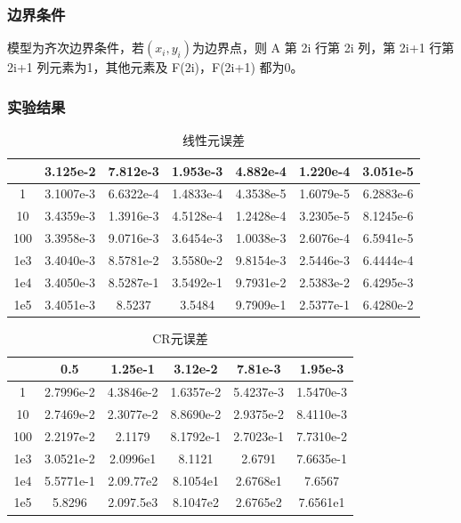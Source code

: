 \documentclass[a4paper,UTF8,titlepage]{ctexart}
\begin{document}
\subsubsection{边界条件}

模型为齐次边界条件，若$(x_i,y_i)$为边界点，则 A 第 2i 行第 2i 列，第 2i+1 行第 2i+1 列元素为1，其他元素及  F(2i)，F(2i+1) 都为0。


%
%

\subsubsection{实验结果}

\begin{table}[h]
	\caption{线性元误差}
	\begin{tabular}{|c|c|c|c|c|c|c|} \hline
		\diagbox{$\lambda$}{h} &3.125e-2 &7.812e-3 &1.953e-3 &4.882e-4 &1.220e-4 &3.051e-5 \\ \hline
		1 &3.1007e-3 &6.6322e-4 &1.4833e-4 &4.3538e-5 &1.6079e-5 &6.2883e-6 \\ \hline
		10 &3.4359e-3 &1.3916e-3 &4.5128e-4 &1.2428e-4 &3.2305e-5 &8.1245e-6 \\ \hline
		100 &3.3958e-3 &9.0716e-3 &3.6454e-3 &1.0038e-3 &2.6076e-4 &6.5941e-5 \\ \hline
		1e3 &3.4040e-3 &8.5781e-2 &3.5580e-2 &9.8154e-3 &2.5446e-3 &6.4444e-4 \\ \hline
		1e4 &3.4050e-3 &8.5287e-1 &3.5492e-1 &9.7931e-2 &2.5383e-2 &6.4295e-3 \\ \hline
		1e5 &3.4051e-3 &8.5237 &3.5484 &9.7909e-1 &2.5377e-1 &6.4280e-2 \\ \hline
	\end{tabular}
\end{table}

\begin{table}[h]
	\caption{CR元误差}
	\begin{tabular}{|c|c|c|c|c|c|} \hline
		\diagbox{$\lambda$}{h} &0.5 &1.25e-1 &3.12e-2 &7.81e-3 &1.95e-3 \\ \hline
		1 &2.7996e-2 &4.3846e-2 &1.6357e-2 &5.4237e-3 &1.5470e-3  \\ \hline
		10 &2.7469e-2 &2.3077e-2 &8.8690e-2 &2.9375e-2 &8.4110e-3  \\ \hline
		100 &2.2197e-2 &2.1179 &8.1792e-1 &2.7023e-1 &7.7310e-2  \\ \hline
		1e3 &3.0521e-2 &2.0996e1 &8.1121 &2.6791 &7.6635e-1  \\ \hline
		1e4 &5.5771e-1 &2.09.77e2 &8.1054e1 &2.6768e1 &7.6567 \\ \hline
		1e5 &5.8296 &2.097.5e3 &8.1047e2 &2.6765e2  &7.6561e1 \\ \hline
	\end{tabular}
\end{table}
\end{document}
